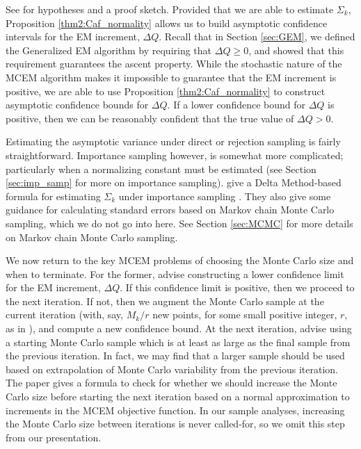 \documentclass[ss]{imsart}
\theoremstyle{plain}
\theoremstyle{definition}
\theoremstyle{remark}
\begin{document}
See \citeauthor{Caf05} for hypotheses and a proof sketch. Provided that we are able to estimate $\Sigma_k$, Proposition \ref{thm2:Caf_normality} allows us to build asymptotic confidence intervals for the EM increment, $\Delta Q$. Recall that in Section \ref{sec:GEM}, we defined the Generalized EM algorithm by requiring that $\Delta Q \geq 0$, and showed that this requirement guarantees the ascent property. While the stochastic nature of the MCEM algorithm makes it impossible to guarantee that the EM increment is positive, we are able to use Proposition \ref{thm2:Caf_normality} to construct asymptotic confidence bounds for $\Delta Q$. If a lower confidence bound for $\Delta Q$ is positive, then we can be reasonably confident that the true value of $\Delta Q > 0$.

Estimating the asymptotic variance under direct or rejection sampling is fairly straightforward. Importance sampling however, is somewhat more complicated; particularly when a normalizing constant must be estimated (see Section \ref{sec:imp_samp} for more on importance sampling). \citeauthor{Caf05} give a Delta Method-based formula for estimating $\Sigma_k$ under importance sampling \citep[see Chapter 3 of][for an overview of the Delta Method]{van98}. They also give some guidance for calculating standard errors based on Markov chain Monte Carlo sampling, which we do not go into here. See Section \ref{sec:MCMC} for more details on Markov chain Monte Carlo sampling. 

We now return to the key MCEM problems of choosing the Monte Carlo size and when to terminate. For the former, \citeauthor{Caf05} advise constructing a lower confidence limit for the EM increment, $\Delta Q$. If this confidence limit is positive, then we proceed to the next iteration. If not, then we augment the Monte Carlo sample at the current iteration (with, say, $M_k/r$ new points, for some small positive integer, $r$, as in \citealp{Boo99}), and compute a new confidence bound. At the next iteration, \citeauthor{Caf05} advise using a starting Monte Carlo sample which is at least as large as the final sample from the previous iteration. In fact, we may find that a larger sample should be used based on extrapolation of Monte Carlo variability from the previous iteration. The paper gives a formula to check for whether we should increase the Monte Carlo size before starting the next iteration based on a normal approximation to increments in the MCEM objective function. In our sample analyses, increasing the Monte Carlo size between iterations is never called-for, so we omit this step from our presentation.
\end{document}
